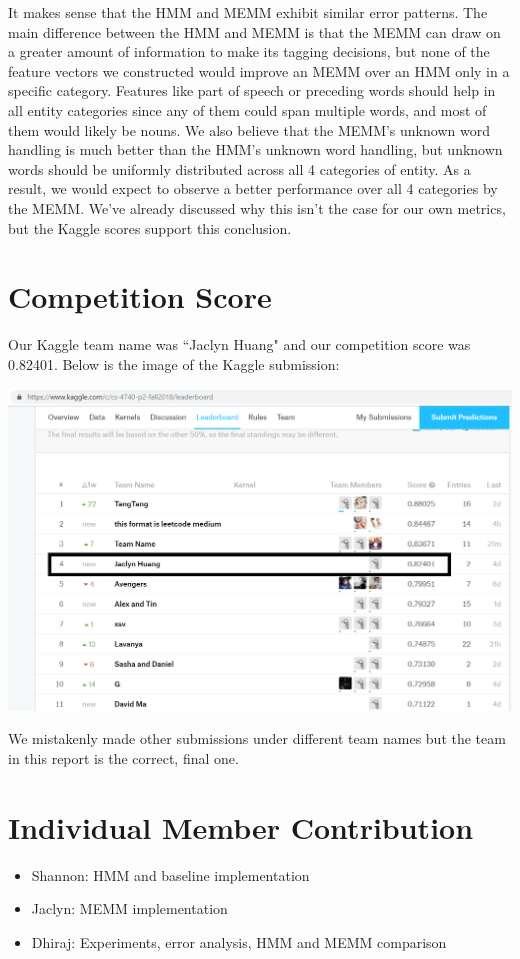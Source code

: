 \documentclass[12pt]{article}
\begin{document}
It makes sense that the HMM and MEMM exhibit similar error patterns. The main difference between the HMM and MEMM is that the MEMM can draw on a greater amount of information to make its tagging decisions, but none of the feature vectors we constructed would improve an MEMM over an HMM only in a specific category. Features like part of speech or preceding words should help in all entity categories since any of them could span multiple words, and most of them would likely be nouns. We also believe that the MEMM's unknown word handling is much better than the HMM's unknown word handling, but unknown words should be uniformly distributed across all 4 categories of entity. As a result, we would expect to observe a better performance over all 4 categories by the MEMM. We've already discussed why this isn't the case for our own metrics, but the Kaggle scores support this conclusion.
  
\section{Competition Score}
Our Kaggle team name was ``Jaclyn Huang" and our competition score was 0.82401. Below is the image of the Kaggle submission:
\begin{center}
	\includegraphics[scale=0.25]{kaggle.png}
\end{center}
We mistakenly made other submissions under different team names but the team in this report is the correct, final one. 

\section{Individual Member Contribution}
\begin{itemize}
	\item Shannon: HMM and baseline implementation
	\item Jaclyn: MEMM implementation
	\item Dhiraj: Experiments, error analysis, HMM and MEMM comparison
\end{itemize}
\end{document}
